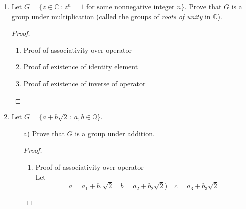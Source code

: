 \documentclass[11pt]{article}
\theoremstyle{definition}  %
\newcommand{\Q}{\mathbb{Q}}
\newcommand{\C}{\mathbb{C}}
\begin{document}
\begin{enumerate}
\begin{proof}
   \end{proof}
   \begin{proof} Proof that G is a group
     \begin{enumerate}
       \item Proof of associativity over operator
       \item Proof of existence of identity element
       \item  Proof of existence of inverse of operator
     \end{enumerate}
   \end{proof}
\item Let $G = \{z \in \C \, : \, z^n = 1 \mbox{  for some nonnegative integer  } n\}$. Prove that $G$ is a group under multiplication (called the groups of {\it roots of unity} in $\C$).
\begin{proof}
  \begin{enumerate}
    \item Proof of associativity over operator
    \item Proof of existence of identity element
    \item  Proof of existence of inverse of operator
  \end{enumerate}
\end{proof}
\item Let $G = \{ a + b\sqrt{2} \, : \, a, b \in \Q\}$.
  \begin{itemize}
  \item[a)] Prove that $G$ is a group under addition.
  \begin{proof}
    \begin{enumerate}
      \item Proof of associativity over operator\\
      Let
      \[
        a=a_1+b_1\sqrt{2}\quad b=a_2+b_2\sqrt{2})\quad c= a_3+b_3\sqrt{2}
      \]


\end{enumerate}
\end{proof}
\end{itemize}
\end{enumerate}
\end{document}
